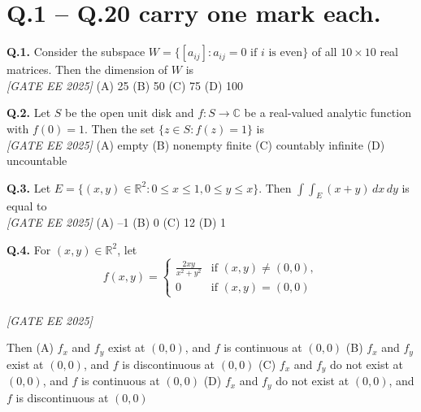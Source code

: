 \documentclass[11pt]{article}
\begin{document}
\section*{Q.1 – Q.20 carry one mark each.}

\textbf{Q.1.} Consider the subspace $W = \{[a_{ij}] : a_{ij} = 0 \text{ if } i \text{ is even} \}$ of all $10 \times 10$ real matrices. Then the dimension of $W$ is  
\\[1ex] \hfill \textit{[GATE EE 2025]}
\newline
(A) 25 \hspace{1cm} (B) 50 \hspace{1cm} (C) 75 \hspace{1cm} (D) 100

\vspace{0.5cm}

\textbf{Q.2.} Let $S$ be the open unit disk and $f : S \to \mathbb{C}$ be a real-valued analytic function with $f(0) = 1$. Then the set $\{z \in S : f(z) = 1\}$ is  
\\[1ex] \hfill \textit{[GATE EE 2025]}
\newline
(A) empty \hspace{1cm} (B) nonempty finite \hspace{1cm} (C) countably infinite \hspace{1cm} (D) uncountable

\vspace{0.5cm}

\textbf{Q.3.} Let $E = \{(x, y) \in \mathbb{R}^2 : 0 \le x \le 1, 0 \le y \le x \}$. Then $\int\int_E (x+y) \, dx \, dy$ is equal to 
\\[1ex] \hfill \textit{[GATE EE 2025]}
\newline
(A) –1 \hspace{1cm} (B) 0 \hspace{1cm} (C) 12 \hspace{1cm} (D) 1

\vspace{0.5cm}

\textbf{Q.4.} For $(x, y) \in \mathbb{R}^2$, let  
\[
f(x, y) = 
\begin{cases}
\frac{2xy}{x^2 + y^2} & \text{if } (x, y) \ne (0, 0), \\
0 & \text{if } (x, y) = (0, 0)
\end{cases}
\]  \\[1ex] \hfill \textit{[GATE EE 2025]}

Then  \newline
(A) $f_x$ and $f_y$ exist at $(0,0)$, and $f$ is continuous at $(0,0)$  \newline
(B) $f_x$ and $f_y$ exist at $(0,0)$, and $f$ is discontinuous at $(0,0)$  \newline
(C) $f_x$ and $f_y$ do not exist at $(0,0)$, and $f$ is continuous at $(0,0)$  \newline
(D) $f_x$ and $f_y$ do not exist at $(0,0)$, and $f$ is discontinuous at $(0,0)$\newline
\end{document}
